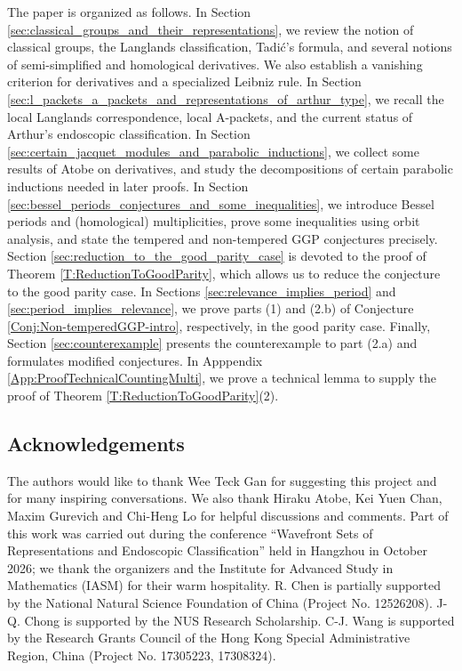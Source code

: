 \documentclass[11pt,letterpaper]{amsart}
\theoremstyle{plain}
\numberwithin{theorem}{section}
\numberwithin{equation}{subsection}
\theoremstyle{remark}
\begin{document}
The paper is organized as follows. In Section \ref{sec:classical_groups_and_their_representations}, we review the notion of classical groups, the Langlands classification, Tadi\'c's formula, and several notions of semi-simplified and homological derivatives. We also establish a vanishing criterion for derivatives and a specialized Leibniz rule. In Section \ref{sec:l_packets_a_packets_and_representations_of_arthur_type}, we recall the local Langlands correspondence, local A-packets, and the current status of Arthur's endoscopic classification. In Section \ref{sec:certain_jacquet_modules_and_parabolic_inductions}, we collect some results of Atobe on derivatives, and study the decompositions of certain parabolic inductions needed in later proofs. In Section \ref{sec:bessel_periods_conjectures_and_some_inequalities}, we introduce Bessel periods and (homological) multiplicities, prove some inequalities using orbit analysis, and state the tempered and non-tempered GGP conjectures precisely. Section \ref{sec:reduction_to_the_good_parity_case} is devoted to the proof of Theorem \ref{T:ReductionToGoodParity}, which allows us to reduce the conjecture to the good parity case. In Sections \ref{sec:relevance_implies_period} and \ref{sec:period_implies_relevance}, we prove parts (1) and (2.b) of Conjecture \ref{Conj:Non-temperedGGP-intro}, respectively, in the good parity case. Finally, Section \ref{sec:counterexample} presents the counterexample to part (2.a) and formulates modified conjectures. In Apppendix \ref{App:ProofTechnicalCountingMulti}, we prove a technical lemma to supply the proof of Theorem \ref{T:ReductionToGoodParity}(2).

\vskip 5pt

\subsection*{Acknowledgements}
The authors would like to thank Wee Teck Gan for suggesting this project and for many inspiring conversations. We also thank Hiraku Atobe, Kei Yuen Chan, Maxim Gurevich and Chi-Heng Lo for helpful discussions and comments. Part of this work was carried out during the conference ``Wavefront Sets of Representations and Endoscopic Classification'' held in Hangzhou in October 2026; we thank the organizers and the Institute for Advanced Study in Mathematics (IASM) for their warm hospitality. R. Chen is partially supported by the National Natural Science Foundation of China (Project No. 12526208). J-Q. Chong is supported by the NUS Research Scholarship. C-J. Wang is supported by the Research Grants Council of the Hong Kong Special Administrative Region, China (Project No. 17305223, 17308324).
\end{document}
